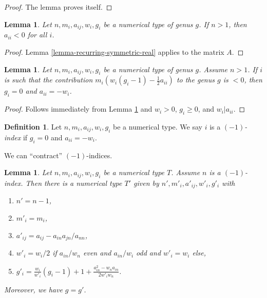 \documentclass{stacks-project}
\theoremstyle{plain}
\newtheorem{lemma}[subsection]{Lemma}
\theoremstyle{definition}
\newtheorem{definition}[subsection]{Definition}
\theoremstyle{remark}
\numberwithin{equation}{subsection}
\begin{document}
\begin{proof}
The lemma proves itself.
\end{proof}

\begin{lemma}
\label{lemma-diagonal-negative}
Let $n, m_i, a_{ij}, w_i, g_i$ be a numerical type of genus $g$.
If $n > 1$, then $a_{ii} < 0$ for all $i$.
\end{lemma}

\begin{proof}
Lemma \ref{lemma-recurring-symmetric-real} applies to the matrix $A$.
\end{proof}

\begin{lemma}
\label{lemma-minus-one}
Let $n, m_i, a_{ij}, w_i, g_i$ be a numerical type of genus $g$.
Assume $n > 1$. If $i$ is such that the contribution
$m_i(w_i(g_i - 1) - \frac{1}{2} a_{ii})$
to the genus $g$ is $< 0$, then $g_i = 0$ and $a_{ii} = -w_i$.
\end{lemma}

\begin{proof}
Follows immediately from Lemma \ref{lemma-diagonal-negative} and
$w_i > 0$, $g_i \geq 0$, and $w_i | a_{ii}$.
\end{proof}

\begin{definition}
\label{definition-type-minus-one}
Let $n, m_i, a_{ij}, w_i, g_i$ be a numerical type.
We say $i$ is a {\it $(-1)$-index} if $g_i = 0$ and $a_{ii} = -w_i$.
\end{definition}

\noindent
We can ``contract'' $(-1)$-indices.

\begin{lemma}
\label{lemma-contract}
Let $n, m_i, a_{ij}, w_i, g_i$ be a numerical type $T$.
Assume $n$ is a $(-1)$-index. Then there is a numerical
type $T'$ given by $n', m'_i, a'_{ij}, w'_i, g'_i$ with
\begin{enumerate}
\item $n' = n - 1$,
\item $m'_i = m_i$,
\item $a'_{ij} = a_{ij} - a_{in}a_{jn}/a_{nn}$,
\item $w'_i = w_i/2$ if $a_{in}/w_n$ even and $a_{in}/w_i$ odd
and $w'_i = w_i$ else,
\item $g'_i =
\frac{w_i}{w'_i}(g_i - 1) + 1 + \frac{a_{in}^2 - w_na_{in}}{2w'_iw_n}$.
\end{enumerate}
Moreover, we have $g = g'$.
\end{lemma}
\end{document}
